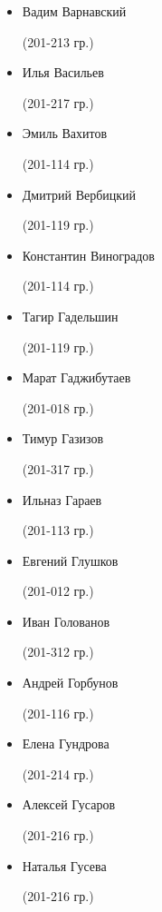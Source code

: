 \begin{multicols}{2}
\begin{small}
\begin{itemize}[leftmargin=0.5em]
	\item[] Вадим Варнавский\begin{tiny} (201-213 гр.)\end{tiny}
	\item[] Илья Васильев\begin{tiny} (201-217 гр.)\end{tiny}
	\item[] Эмиль Вахитов\begin{tiny} (201-114 гр.)\end{tiny}
	\item[] Дмитрий Вербицкий\begin{tiny} (201-119 гр.)\end{tiny}
	\item[] Константин Виноградов\begin{tiny} (201-114 гр.)\end{tiny} %

	\item[] Тагир Гадельшин\begin{tiny} (201-119 гр.)\end{tiny}
	\item[] Марат Гаджибутаев\begin{tiny} (201-018 гр.)\end{tiny}
	\item[] Тимур Газизов\begin{tiny} (201-317 гр.)\end{tiny} %
	\item[] Ильназ Гараев\begin{tiny} (201-113 гр.)\end{tiny}
	\item[] Евгений Глушков\begin{tiny} (201-012 гр.)\end{tiny}
	\item[] Иван Голованов\begin{tiny} (201-312 гр.)\end{tiny} %
	\item[] Андрей Горбунов\begin{tiny} (201-116 гр.)\end{tiny} %
	\item[] Елена Гундрова\begin{tiny} (201-214 гр.)\end{tiny}
	\item[] Алексей Гусаров\begin{tiny} (201-216 гр.)\end{tiny}
	\item[] Наталья Гусева\begin{tiny} (201-216 гр.)\end{tiny} %


\end{itemize}
\end{small}
\end{multicols}
